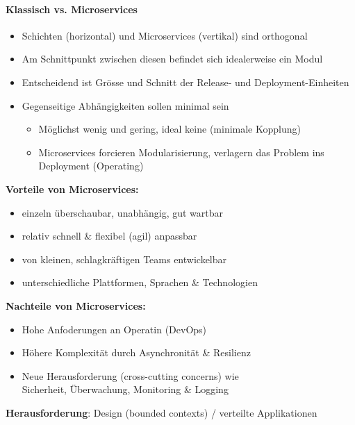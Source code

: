 \documentclass[a4paper]{article}
\begin{document}
				\paragraph{Klassisch vs. Microservices}
				
					\begin{itemize}
						\item Schichten (horizontal) und Microservices (vertikal) sind orthogonal
						\item Am Schnittpunkt zwischen diesen befindet sich idealerweise ein Modul
						\item Entscheidend ist Grösse und Schnitt der Release- und Deployment-Einheiten
						\item Gegenseitige Abhängigkeiten sollen minimal sein
							\begin{itemize}
								\item Möglichst wenig und gering, ideal keine (minimale Kopplung)
								\item Microservices forcieren Modularisierung, verlagern das Problem ins Deployment (Operating)\\
							\end{itemize}
					\end{itemize}
				
				\textbf{Vorteile von Microservices:}
				\begin{itemize}
					\item einzeln überschaubar, unabhängig, gut wartbar
					\item relativ schnell \& flexibel (agil) anpassbar
					\item von kleinen, schlagkräftigen Teams entwickelbar
					\item unterschiedliche Plattformen, Sprachen \& Technologien
				\end{itemize}
				\textbf{Nachteile von Microservices:}
				\begin{itemize}
					\item Hohe Anfoderungen an Operatin (DevOps)
					\item Höhere Komplexität durch Asynchronität \& Resilienz
					\item Neue Herausforderung (cross-cutting concerns) wie \\
					Sicherheit, Überwachung, Monitoring \& Logging\\
				\end{itemize}
				\textbf{Herausforderung}: Design (bounded contexts) / verteilte Applikationen
					
		\newpage			
		
\end{document}
